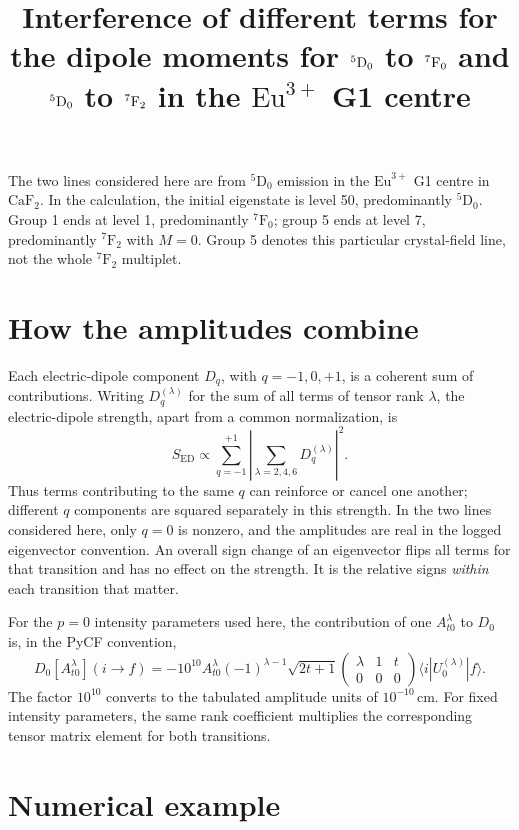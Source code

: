 \documentclass[11pt,a4paper]{article}
\title{Interference of different terms for the dipole moments for
  \(\Dzero\) to \(\Fzero\) and \(\Dzero\) to \(\Ftwo\)
  in the \(\mathrm{Eu}^{3+}\) G1 centre}
\author{}
\date{}
\newcommand{\Dzero}{{}^{5}\mathrm{D}_{0}}
\newcommand{\Fzero}{{}^{7}\mathrm{F}_{0}}
\newcommand{\Ftwo}{{}^{7}\mathrm{F}_{2}}
\begin{document}
\maketitle

The two lines considered here are from \(\Dzero\) emission in the
\(\mathrm{Eu}^{3+}\) G1 centre in \(\mathrm{CaF}_2\).
In the calculation, the initial eigenstate is level 50, predominantly
\(\Dzero\). Group 1 ends at level 1, predominantly \(\Fzero\);
group 5 ends at level 7, predominantly \(\Ftwo\) with \(M=0\).
Group 5 denotes this particular crystal-field line, not the whole
\(\Ftwo\) multiplet.

\section*{How the amplitudes combine}

Each electric-dipole component \(D_q\), with \(q=-1,0,+1\), is a
coherent sum of contributions. Writing \(D_q^{(\lambda)}\) for the
sum of all terms of tensor rank \(\lambda\), the electric-dipole
strength, apart from a common normalization, is
\[
  S_{\mathrm{ED}} \propto
  \sum_{q=-1}^{+1}\left|\sum_{\lambda=2,4,6}
    D_q^{(\lambda)}\right|^2 .
\]
Thus terms contributing to the same \(q\) can reinforce or cancel
one another; different \(q\) components are squared separately in
this strength. In the two lines considered here, only \(q=0\) is
nonzero, and the amplitudes are real in the logged eigenvector
convention. An overall sign change of an eigenvector flips all terms
for that transition and has no effect on the strength. It is the
relative signs \emph{within} each transition that matter.

For the \(p=0\) intensity parameters used here, the contribution of
one \(A^{\lambda}_{t0}\) to \(D_0\) is, in the PyCF convention,
\[
  D_0[A^{\lambda}_{t0}](i\to f)
  = -10^{10} A^{\lambda}_{t0}(-1)^{\lambda-1}\sqrt{2t+1}
    \begin{pmatrix}\lambda&1&t\\0&0&0\end{pmatrix}
    \langle i|U^{(\lambda)}_0|f\rangle .
\]
The factor \(10^{10}\) converts to the tabulated amplitude units of
\(10^{-10}\,\mathrm{cm}\). For fixed intensity parameters, the same
rank coefficient multiplies the corresponding tensor matrix element
for both transitions.

\section*{Numerical example}
\end{document}
